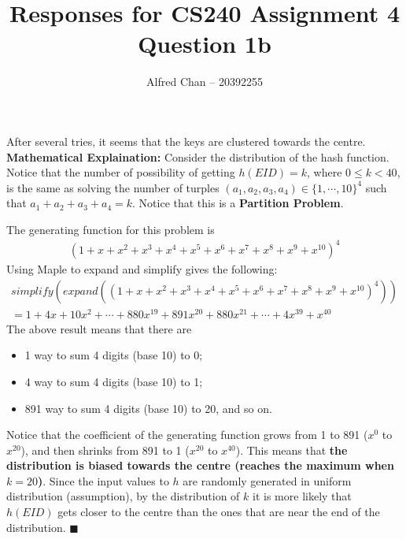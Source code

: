 \documentclass[12pt]{article}
\title{Responses for CS240 Assignment 4 Question 1b}
\author{Alfred Chan -- 20392255}
\begin{document}
\maketitle
After several tries, it seems that the keys are clustered towards the centre.\\

{\bf Mathematical Explaination:} Consider the distribution of the hash function.
Notice that the number of possibility of getting $h(EID) = k$,
where $0 \le k < 40$, is the same as solving the number of turples 
	$(a_1,a_2,a_3,a_4) \in \{1, \cdots, 10\}^4$ such that $a_1 + a_2 + a_3 + a_4 = k$.
Notice that this is a {\bf Partition Problem}.

The generating function for this problem is
\begin{align}
(1+x+x^2+x^3+x^4+x^5+x^6+x^7+x^8+x^9+x^{10})^4
\end{align}
Using Maple to expand and simplify gives the following:
\begin{gather*}
simplify(expand((1+x+x^2+x^3+x^4+x^5+x^6+x^7+x^8+x^9+x^10)^4))\\
= 1+4x+10x^2+ \cdots
	+ 880x^{19} + 891x^{20} + 880x^{21} + \cdots
	+ 4x^{39} + x^{40}
\end{gather*}
The above result means that there are
\begin{itemize}
\item 1 way to sum 4 digits (base 10) to 0;
\item 4 way to sum 4 digits (base 10) to 1;
\item 891 way to sum 4 digits (base 10) to 20, and so on.
\end{itemize}

Notice that the coefficient of the generating function
	grows from 1 to 891 ($x^{0}$ to $x^{20}$),
	and then shrinks from 891 to 1 ($x^{20}$ to $x^{40}$).
This means that {\bf the distribution is biased towards the centre (reaches the maximum when $k=20$)}.
Since the input values to $h$ are randomly generated in uniform distribution (assumption),
by the distribution of $k$ it is more likely that $h(EID)$ gets closer to the centre than the ones that are near the end of the distribution.
\hfill $\blacksquare$
\end{document}
